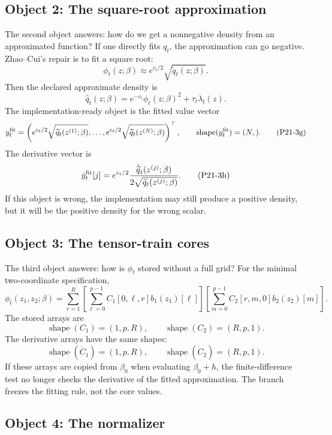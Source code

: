 \documentclass[11pt]{article}
\newcommand{\shape}{\operatorname{shape}}
\begin{document}
\subsection{Object 2: The square-root approximation}

The second object answers: how do we get a nonnegative density from an
approximated function?  If one directly fits \(q_t\), the approximation can go
negative.  Zhao--Cui's repair is to fit a square root:
\[
    \phi_t(z;\beta)\approx e^{c_t/2}\sqrt{\widetilde q_t(z;\beta)}.
    \tag{P21-3e}
\]
Then the declared approximate density is
\[
    \widehat q_t(z;\beta)
    =
    e^{-c_t}\phi_t(z;\beta)^2+\tau_t\lambda_t(z).
    \tag{P21-3f}
\]
The implementation-ready object is the fitted value vector
\[
    y_t^{\rm fit}
    =
    \left(e^{c_t/2}\sqrt{\widetilde q_t(z^{(1)};\beta)},\ldots,
    e^{c_t/2}\sqrt{\widetilde q_t(z^{(N)};\beta)}\right)^\top,
    \qquad
    \shape(y_t^{\rm fit})=(N,).
    \tag{P21-3g}
\]
The derivative vector is
\[
    \dot y_t^{\rm fit}[j]
    =
    e^{c_t/2}
    \frac{\dot{\widetilde q}_t(z^{(j)};\beta)}
    {2\sqrt{\widetilde q_t(z^{(j)};\beta)}}.
    \tag{P21-3h}
\]
If this object is wrong, the implementation may still produce a positive
density, but it will be the positive density for the wrong scalar.

\subsection{Object 3: The tensor-train cores}

The third object answers: how is \(\phi_t\) stored without a full grid?  For
the minimal two-coordinate specification,
\[
    \phi_t(z_1,z_2;\beta)
    =
    \sum_{r=1}^R
    \left[
    \sum_{\ell=0}^{p-1}C_1[0,\ell,r]b_1(z_1)[\ell]
    \right]
    \left[
    \sum_{m=0}^{p-1}C_2[r,m,0]b_2(z_2)[m]
    \right].
    \tag{P21-3i}
\]
The stored arrays are
\[
    \shape(C_1)=(1,p,R),
    \qquad
    \shape(C_2)=(R,p,1).
    \tag{P21-3j}
\]
The derivative arrays have the same shapes:
\[
    \shape(\dot C_1)=(1,p,R),
    \qquad
    \shape(\dot C_2)=(R,p,1).
    \tag{P21-3k}
\]
If these arrays are copied from \(\beta_0\) when evaluating
\(\beta_0+h\), the finite-difference test no longer checks the derivative of
the fitted approximation.  The branch freezes the fitting rule, not the core
values.

\subsection{Object 4: The normalizer}
\end{document}

